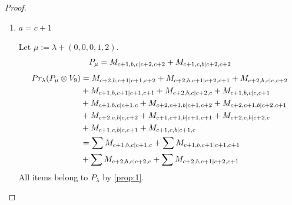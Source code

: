 \begin{proof}
\begin{enumerate}
\begin{enumerate}
        \item $a=c+1$ \par
        Let $\mu:=\lambda + (0,0,0,1,2) $.
        \begin{equation}\notag
          \begin{aligned}
            P_\mu = M_{c+1,b,c|c+2,c+2}
+ M_{c+1,c,b|c+2,c+2}
          \end{aligned}
        \end{equation}
        \begin{equation}\notag
          \begin{aligned}
            Pr_{\lambda}(P_\mu \otimes V_{9}) &=
M_{c+2,b,c+1|c+1,c+2}
+ M_{c+2,b,c+1|c+2,c+1}
+ M_{c+2,b,c|c,c+2}\\
                                              &
+ M_{c+1,b,c+1|c+1,c+1}
+ M_{c+2,b,c|c+2,c}
+ M_{c+1,b,c|c,c+1}\\
                                              &
+ M_{c+1,b,c|c+1,c}
+ M_{c+2,c+1,b|c+1,c+2}
+ M_{c+2,c+1,b|c+2,c+1}\\
                                              &
+ M_{c+2,c,b|c,c+2}
+ M_{c+1,c+1,b|c+1,c+1}
+ M_{c+2,c,b|c+2,c}\\
                                              &
+ M_{c+1,c,b|c,c+1}
+ M_{c+1,c,b|c+1,c} \\
                                               &=
\sum M_{c+1,b,c|c+1,c}
+ \sum M_{c+1,b,c+1|c+1,c+1}\\
                                               &
+ \sum M_{c+2,b,c|c+2,c}
+ \sum M_{c+2,b,c+1|c+2,c+1}
          \end{aligned}
        \end{equation}
All items belong to $P_\lambda$ by \cref{prop:1}.
      \end{enumerate}


\end{enumerate}
\end{proof}
